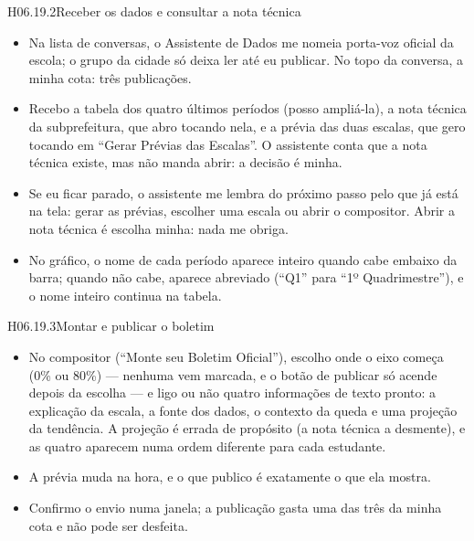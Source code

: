 \begin{historia}{H06.19.2}{Receber os dados e consultar a nota técnica}{\pronto}
\aceite
\begin{itemize}
  \item Na lista de conversas, o Assistente de Dados me nomeia porta-voz
    oficial da escola; o grupo da cidade só deixa ler até eu publicar. No
    topo da conversa, a minha cota: três publicações.
  \item Recebo a tabela dos quatro últimos períodos (posso ampliá-la), a nota
    técnica da subprefeitura, que abro tocando nela, e a prévia das duas
    escalas, que gero tocando em \enquote{Gerar Prévias das Escalas}. O
    assistente conta que a nota técnica existe, mas não manda abrir: a
    decisão é minha.
  \item Se eu ficar parado, o assistente me lembra do próximo passo pelo que
    já está na tela: gerar as prévias, escolher uma escala ou abrir o
    compositor. Abrir a nota técnica é escolha minha: nada me obriga.
  \item No gráfico, o nome de cada período aparece inteiro quando cabe embaixo
    da barra; quando não cabe, aparece abreviado (\enquote{Q1} para
    \enquote{1º Quadrimestre}), e o nome inteiro continua na tabela.
\end{itemize}
\end{historia}

\begin{historia}{H06.19.3}{Montar e publicar o boletim}{\pronto}
\aceite
\begin{itemize}
  \item No compositor (\enquote{Monte seu Boletim Oficial}), escolho onde o eixo começa (0\% ou 80\%) --- nenhuma
    vem marcada, e o botão de publicar só acende depois da escolha --- e
    ligo ou não quatro informações de texto pronto: a explicação da escala, a
    fonte dos dados, o contexto da queda e uma projeção da tendência. A
    projeção é errada de propósito (a nota técnica a desmente), e as quatro
    aparecem numa ordem diferente para cada estudante.
  \item A prévia muda na hora, e o que publico é exatamente o que ela mostra.
  \item Confirmo o envio numa janela; a publicação gasta uma das três da
    minha cota e não pode ser desfeita.
\end{itemize}
\end{historia}

